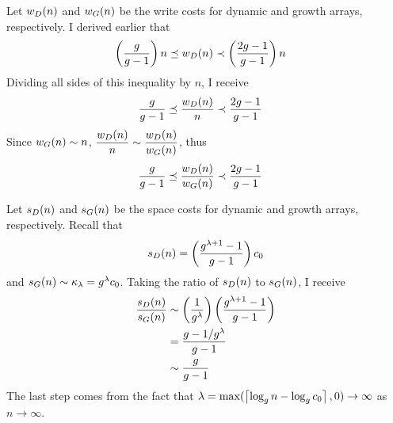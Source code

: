 \HdrTimeComplexCmp

Let $w_D(n)$ and $w_G(n)$ be the write costs for dynamic and growth arrays, respectively. I derived earlier that
\begin{align*}
\left( \frac{g}{g - 1} \right) n \preceq w_D(n) &\prec \left( \frac{2g - 1}{g - 1} \right) n
\end{align*}
Dividing all sides of this inequality by $n$, I receive
\begin{align*}
\frac{g}{g - 1} \preceq \frac {w_D(n)} n &\prec \frac{2g - 1}{g - 1}
\end{align*}
Since $w_G(n) \sim n$, $\dfrac {w_D(n)} n \sim \dfrac{w_D(n)}{w_G(n)}$, thus
\begin{align*}
\frac{g}{g - 1} \preceq \frac {w_D(n)} {w_G(n)} &\prec \frac{2g - 1}{g - 1}
\end{align*}

\HdrSpaceComplexCmp

Let $s_D(n)$ and $s_G(n)$ be the space costs for dynamic and growth arrays, respectively. Recall that
\begin{align*}
s_D(n) = \left( \frac{g^{\lambda + 1} - 1}{g - 1} \right) c_0
\end{align*}
and $s_G(n) \sim \kappa_\lambda = g^\lambda c_0$. Taking the ratio of $s_D(n)$ to $s_G(n)$, I receive
\begin{align*}
\frac{s_D(n)}{s_G(n)} &\sim \left( \frac{1}{g^\lambda} \right) \left( \frac{g^{\lambda + 1} - 1}{g - 1} \right)\\
&= \frac{g - 1 / {g^\lambda}}{g - 1}\\
&\sim \frac{g}{g - 1}
\end{align*}
The last step comes from the fact that $\lambda = \max(\left\lceil \log_{g} n - \log_{g} c_0 \right\rceil, 0) \to \infty$ as $n \to \infty$.